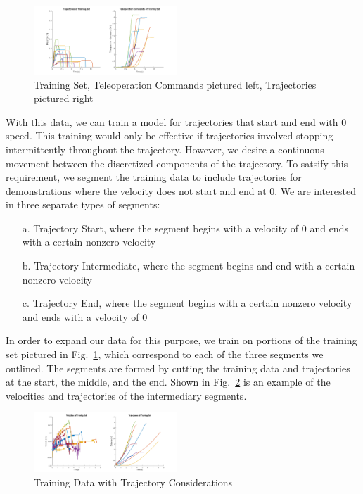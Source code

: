 \documentclass[letterpaper, 10 pt, conference]{ieeeconf}  %
\newcommand\NB[1]{$\spadesuit$\footnote{NB: #1}}
\begin{document}
\begin{figure}[ht]
    \includegraphics[width=0.48\textwidth]{images/training.png}
    \caption{Training Set, Teleoperation Commands pictured left, Trajectories pictured right}
    \label{fig:train}
\end{figure}

With this data, we can train a model for trajectories that start and end with $0$ speed. This training would only be effective if trajectories involved stopping intermittently throughout the trajectory. However, we desire a continuous movement between the discretized components of the trajectory. To satsify this requirement, we segment the training data to include trajectories for demonstrations where the velocity does not start and end at $0$. We are interested in three separate types of segments:
\begin{itemize}
    \item[a.] Trajectory Start, where the segment begins with a velocity of $0$ and ends with a certain nonzero velocity
    \item[b.] Trajectory Intermediate, where the segment begins and end with a certain nonzero velocity
    \item[c.] Trajectory End, where the segment begins with a certain nonzero velocity and ends with a velocity of $0$
\end{itemize}
In order to expand our data for this purpose, we train on portions of the training set pictured in Fig.~\ref{fig:train}, which correspond to each of the three segments we outlined. The segments are formed by cutting the training data and trajectories at the start, the middle, and the end. Shown in Fig.~\ref{fig:trainelab} is an example of the velocities and trajectories of the intermediary segments.
\begin{figure}[h]
	\includegraphics[width=0.48\textwidth]{images/inttrain.png}
	\caption{Training Data with Trajectory Considerations}
	\label{fig:trainelab}
\end{figure}
\end{document}
